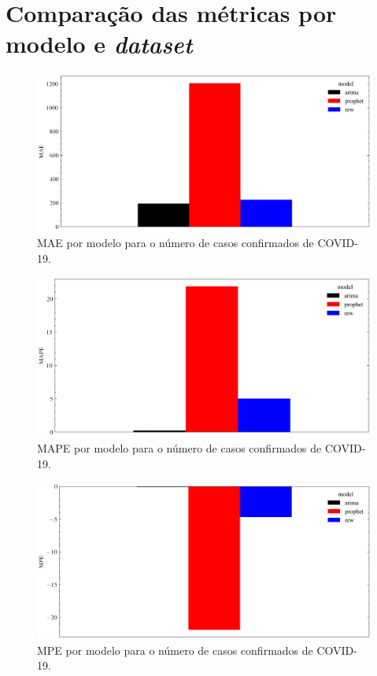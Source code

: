 \chapter{Comparação das métricas por modelo e \textit{dataset}}
\label{apen:a}

\begin{figure}[!htp]
    \centering
    \includegraphics[width=5.0in]{img/covid_mae_comparison.pdf}
    \caption{MAE por modelo para o número de casos confirmados de COVID-19.}
\end{figure}

\begin{figure}[!htp]
    \centering
    \includegraphics[width=5.0in]{img/covid_mape_comparison.pdf}
    \caption{MAPE por modelo para o número de casos confirmados de COVID-19.}
\end{figure}

\begin{figure}[!htp]
    \centering
    \includegraphics[width=5.0in]{img/covid_mpe_comparison.pdf}
    \caption{MPE por modelo para o número de casos confirmados de COVID-19.}
\end{figure}

